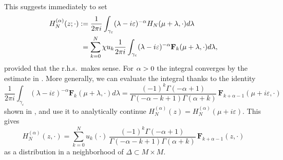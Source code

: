 \documentclass[JEP,XML,SOM,Unicode]{cedram}
\theoremstyle{definition}
\let\cv\alpha
\let\varm k
\let\Re\relax
\DeclareMathOperator{\Re}{Re}
\newcommand*{\defeq}{:=}
\begin{document}
This suggests immediately to set
\[
\begin{aligned}
H_N^{(\cv)}(z;\cdot)&\defeq \frac{1}{2\pi i}\int_{\gamma_\varepsilon} (\lambda-i\varepsilon)^{-\cv} H_N(\mu+\lambda,\cdot) d\lambda \\
& \hphantom{:}=\sum_{\varm=0}^N \chi u_\varm\frac{1}{2\pi i}\int_{\gamma_{\varepsilon}}(\lambda-i\varepsilon)^{-\cv} \mathbf{F}_\varm(\mu+\lambda,\cdot) d\lambda,
\end{aligned}
\]
provided that the r.h.s.~makes sense. For $\Re \cv >0$ the integral converges by the estimate in \cite[Lem.\,6.1]{Dang2020}. More generally, we can evaluate the integral thanks to the identity
\[
\frac{1}{2\pi i}\int_{\gamma_\varepsilon}(\lambda-i\varepsilon)^{-\cv} \mathbf{F}_\varm(\mu+\lambda,\cdot) d\lambda =\frac{(-1)^\varm\Gamma(-\cv+1)}{\Gamma(-\cv-\varm+1)\Gamma(\cv+\varm)}\, \mathbf{F}_{\varm+\cv-1}(\mu+i\varepsilon,\cdot)
\]
shown in \cite[\S7.1]{Dang2020}, and use it to analytically continue $H_N^{(\cv)}(z)=H_N^{(\cv)}(\mu+i\varepsilon)$. This gives
\[
H_N^{(\cv)}(z,\cdot) =
\sum_{\varm=0}^N u_\varm(\cdot)\,\frac{(-1)^\varm\Gamma(-\cv+1)}{\Gamma(-\cv-\varm+1)\Gamma(\cv+\varm)}\, \mathbf{F}_{\varm+\cv-1}(z,\cdot)
\]
as a distribution in a neighborhood of $\Delta\subset M\times M$.
\end{document}

